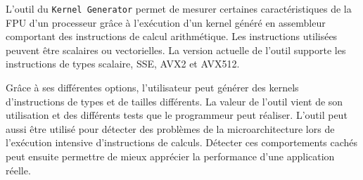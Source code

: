        L'outil du \verb=Kernel Generator= permet de mesurer certaines caractéristiques de la FPU d'un processeur grâce à l'exécution d'un kernel généré en assembleur comportant des instructions de calcul arithmétique. Les instructions utilisées peuvent être scalaires ou vectorielles. La version actuelle de l'outil supporte les instructions de types scalaire, SSE, AVX2 et AVX512. 
            
        Grâce à ses différentes options, l'utilisateur peut générer des kernels d'instructions de types et de tailles différents. La valeur de l'outil vient de son utilisation et des différents tests que le programmeur peut réaliser. L'outil peut aussi être utilisé pour détecter des problèmes de la microarchitecture lors de l'exécution intensive d'instructions de calculs. Détecter ces comportements cachés peut ensuite permettre de mieux apprécier la performance d'une application réelle. 
            

        
        

